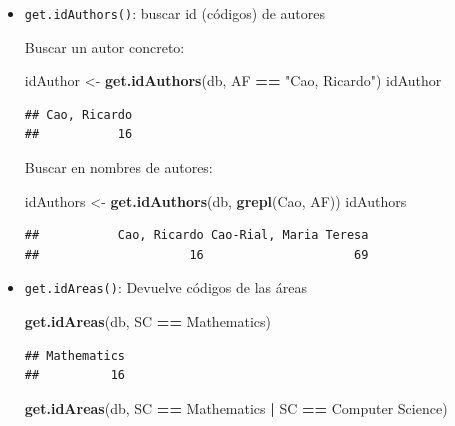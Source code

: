 \documentclass[
]{book}
\newenvironment{Shaded}{\begin{snugshade}}{\end{snugshade}}
\newcommand{\FunctionTok}[1]{\textcolor[rgb]{0.13,0.29,0.53}{\textbf{#1}}}
\newcommand{\NormalTok}[1]{#1}
\newcommand{\OtherTok}[1]{\textcolor[rgb]{0.56,0.35,0.01}{#1}}
\newcommand{\SpecialCharTok}[1]{\textcolor[rgb]{0.81,0.36,0.00}{\textbf{#1}}}
\newcommand{\StringTok}[1]{\textcolor[rgb]{0.31,0.60,0.02}{#1}}
\begin{document}
\begin{itemize}
\item
  \texttt{get.idAuthors()}: buscar id (códigos) de autores

  Buscar un autor concreto:

\begin{Shaded}
\begin{Highlighting}[]
\NormalTok{idAuthor }\OtherTok{\textless{}{-}} \FunctionTok{get.idAuthors}\NormalTok{(db, AF }\SpecialCharTok{==} \StringTok{"Cao, Ricardo"}\NormalTok{)}
\NormalTok{idAuthor}
\end{Highlighting}
\end{Shaded}

\begin{verbatim}
## Cao, Ricardo 
##           16
\end{verbatim}

  Buscar en nombres de autores:

\begin{Shaded}
\begin{Highlighting}[]
\NormalTok{idAuthors }\OtherTok{\textless{}{-}} \FunctionTok{get.idAuthors}\NormalTok{(db, }\FunctionTok{grepl}\NormalTok{(}\StringTok{\textquotesingle{}Cao\textquotesingle{}}\NormalTok{, AF))}
\NormalTok{idAuthors}
\end{Highlighting}
\end{Shaded}

\begin{verbatim}
##           Cao, Ricardo Cao-Rial, Maria Teresa 
##                     16                     69
\end{verbatim}
\item
  \texttt{get.idAreas()}: Devuelve códigos de las áreas

\begin{Shaded}
\begin{Highlighting}[]
\FunctionTok{get.idAreas}\NormalTok{(db, SC }\SpecialCharTok{==} \StringTok{\textquotesingle{}Mathematics\textquotesingle{}}\NormalTok{)}
\end{Highlighting}
\end{Shaded}

\begin{verbatim}
## Mathematics 
##          16
\end{verbatim}

\begin{Shaded}
\begin{Highlighting}[]
\FunctionTok{get.idAreas}\NormalTok{(db, SC }\SpecialCharTok{==} \StringTok{\textquotesingle{}Mathematics\textquotesingle{}} \SpecialCharTok{|}\NormalTok{ SC }\SpecialCharTok{==} \StringTok{\textquotesingle{}Computer Science\textquotesingle{}}\NormalTok{)}
\end{Highlighting}
\end{Shaded}


\end{itemize}
\end{document}
